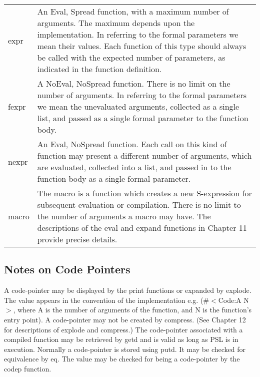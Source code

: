 \begin{tabular}{lp{12.5cm}}

expr & An Eval, Spread function, with a maximum number of  arguments. The 
maximum   depends  upon  the
              implementation.    In  referring  to  the   formal
              parameters we mean their values.  Each function of
              this   type  should  always  be  called  with  the
              expected number of parameters, as indicated in the
              function definition.\\

fexpr &         A NoEval, NoSpread function.  There is no limit on
              the number of arguments.    In  referring  to  the
              formal   parameters   we   mean   the  unevaluated
              arguments, collected as a single list, and  passed
              as a single formal parameter to the function body.\\

nexpr &         An  Eval,  NoSpread  function.   Each call on this
              kind of function may present a different number of
              arguments, which are evaluated, collected  into  a
              list,  and  passed  in  to  the function body as a
              single formal parameter.\\

macro &         The macro  is  a  function  which  creates  a  new
              S-expression    for   subsequent   evaluation   or
              compilation.  There is no limit to the  number  of
              arguments  a  macro may have.  The descriptions of
              the  eval  and  expand  functions  in  Chapter  11
              provide precise details.\\
\end{tabular}
\subsection{Notes on Code Pointers}

  A  code-pointer  may  be  displayed  by the print functions or
expanded by explode.  The value appears in the convention of the
implementation e.g. (\#$<$Code:A N$>$,  where  A  is  the  number  of
arguments of the function, and N is the function's entry point).
A  code-pointer may not be created by compress.  (See Chapter 12
for descriptions of explode and  compress.)    The  code-pointer
associated with a compiled function may be retrieved by getd and
is valid as long as PSL is in execution. Normally a code-pointer
is  stored using putd.  It may be checked for equivalence by eq.
The value may be checked for being a code-pointer by  the  codep
function.

